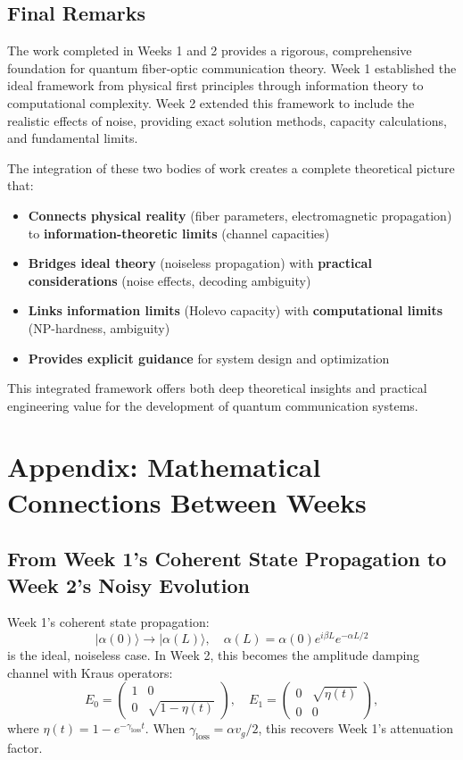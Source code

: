 \documentclass[12pt,a4paper]{article}
\begin{document}
\subsection{Final Remarks}
The work completed in Weeks 1 and 2 provides a rigorous, comprehensive foundation for quantum fiber-optic communication theory. Week 1 established the ideal framework from physical first principles through information theory to computational complexity. Week 2 extended this framework to include the realistic effects of noise, providing exact solution methods, capacity calculations, and fundamental limits.

The integration of these two bodies of work creates a complete theoretical picture that:
\begin{itemize}
    \item \textbf{Connects physical reality} (fiber parameters, electromagnetic propagation) to \textbf{information-theoretic limits} (channel capacities)
    \item \textbf{Bridges ideal theory} (noiseless propagation) with \textbf{practical considerations} (noise effects, decoding ambiguity)
    \item \textbf{Links information limits} (Holevo capacity) with \textbf{computational limits} (NP-hardness, ambiguity)
    \item \textbf{Provides explicit guidance} for system design and optimization
\end{itemize}

This integrated framework offers both deep theoretical insights and practical engineering value for the development of quantum communication systems.

\appendix
\section{Appendix: Mathematical Connections Between Weeks}

\subsection{From Week 1's Coherent State Propagation to Week 2's Noisy Evolution}
Week 1's coherent state propagation:
\[
|\alpha(0)\rangle \to |\alpha(L)\rangle, \quad \alpha(L) = \alpha(0)e^{i\beta L}e^{-\alpha L/2}
\]
is the ideal, noiseless case. In Week 2, this becomes the amplitude damping channel with Kraus operators:
\[
E_0 = \begin{pmatrix} 1 & 0 \\ 0 & \sqrt{1-\eta(t)} \end{pmatrix}, \quad E_1 = \begin{pmatrix} 0 & \sqrt{\eta(t)} \\ 0 & 0 \end{pmatrix},
\]
where $\eta(t) = 1 - e^{-\gamma_{\text{loss}}t}$. When $\gamma_{\text{loss}} = \alpha v_g/2$, this recovers Week 1's attenuation factor.
\end{document}
